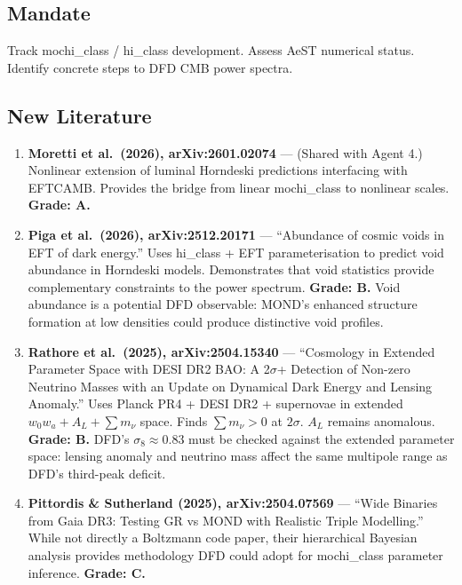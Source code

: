 \documentclass[11pt,a4paper]{article}
\begin{document}
\subsection{Mandate}
Track mochi\_class / hi\_class development. Assess AeST numerical status. Identify concrete steps to DFD CMB power spectra.

\subsection{New Literature}

\begin{enumerate}

\item \textbf{Moretti et al.\ (2026), arXiv:2601.02074} --- (Shared with Agent 4.) Nonlinear extension of luminal Horndeski predictions interfacing with EFTCAMB. Provides the bridge from linear mochi\_class to nonlinear scales. \textbf{Grade: A.}

\item \textbf{Piga et al.\ (2026), arXiv:2512.20171} --- ``Abundance of cosmic voids in EFT of dark energy.'' Uses hi\_class + EFT parameterisation to predict void abundance in Horndeski models. Demonstrates that void statistics provide complementary constraints to the power spectrum. \textbf{Grade: B.} Void abundance is a potential DFD observable: MOND's enhanced structure formation at low densities could produce distinctive void profiles.

\item \textbf{Rathore et al.\ (2025), arXiv:2504.15340} --- ``Cosmology in Extended Parameter Space with DESI DR2 BAO: A 2$\sigma$+ Detection of Non-zero Neutrino Masses with an Update on Dynamical Dark Energy and Lensing Anomaly.'' Uses Planck PR4 + DESI DR2 + supernovae in extended $w_0w_a + A_L + \sum m_\nu$ space. Finds $\sum m_\nu > 0$ at $2\sigma$. $A_L$ remains anomalous. \textbf{Grade: B.} DFD's $\sigma_8 \approx 0.83$ must be checked against the extended parameter space: lensing anomaly and neutrino mass affect the same multipole range as DFD's third-peak deficit.

\item \textbf{Pittordis \& Sutherland (2025), arXiv:2504.07569} --- ``Wide Binaries from Gaia DR3: Testing GR vs MOND with Realistic Triple Modelling.'' While not directly a Boltzmann code paper, their hierarchical Bayesian analysis provides methodology DFD could adopt for mochi\_class parameter inference. \textbf{Grade: C.}

\end{enumerate}
\end{document}
